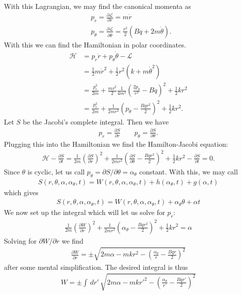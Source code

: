 \documentclass{article}
\theoremstyle{definition}
\newcommand{\p}{\partial}
\newcommand{\lag}{\mathcal{L}}
\newcommand{\ham}{\mathcal{H}}
\newcommand{\al}{\alpha}
\newcommand{\f}[2]{\frac{#1}{#2}}
\newcommand{\lp}{\left(}
\newcommand{\rp}{\right)}
\begin{document}
\begin{enumerate}[label=(\alph*)]
	With this Lagrangian, we may find the canonical momenta as 
	\begin{align*}
	&p_r = \f{\p \lag}{\p \dot r} =  m\dot r\\
	&p_\theta = \f{\p \lag}{\p \dot \theta}  = \f{r^2}{2} (Bq + 2m\dot\theta).
	\end{align*}
	With this we can find the Hamiltonian in polar coordinates. 
	\begin{align*}
	\ham  
	&= p_r \dot r + p_\theta \dot\theta - \lag \\
	&= \f{1}{2}m\dot r^2+ \f{1}{2}r^2(k+m\dot\theta^2) \\
	&= \f{p_r^2}{2m} + \f{mr^2}{2} \f{1}{4m^2}\lp \f{2p_\theta}{r^2} - Bq  \rp^2 + \f{1}{2}kr^2 \\
	&= \f{p_r^2}{2m} + \f{1}{2mr^2}\lp p_\theta - \f{Bqr^2}{2} \rp^2 + \f{1}{2}kr^2.
	\end{align*}
	Let $S$ be the Jacobi's complete integral. Then we have
	\begin{align*}
	p_r = \f{\p S}{\p r} \quad \quad p_\theta = \f{\p S}{\p \theta}.
	\end{align*}
	Plugging this into the Hamiltonian we find the Hamilton-Jacobi equation:
	\begin{align*}
	\ham  - \f{\p S}{\p t}  =
	\f{1}{2m}\lp \f{\p S}{\p r} \rp^2 + \f{1}{2mr^2}\lp \f{\p S}{\p \theta} - \f{Bqr^2}{2} \rp^2 + \f{1}{2}kr^2
	 - \f{\p S}{\p t} =0. 
	\end{align*}
	Since $\theta$ is cyclic, let us call $p_\theta = \p S/\p \theta  = \al_\theta$ constant. With this, we may call
	\begin{align*}
	S(r,\theta,\al,\al_\theta,t) = W(r,\theta,\al,\al_\theta,t) + h(\al_\theta,t) + g(\al,t)
	\end{align*}
	which gives
	\begin{align*}
	S(r,\theta,\al,\al_\theta,t) = W(r,\theta,\al,\al_\theta,t) + \al_\theta \theta + \al t
	\end{align*}
	We now set up the integral which will let us solve for $p_r$:
	\begin{align*}
	\f{1}{2m}\lp \f{\p W}{\p r} \rp^2 + \f{1}{2mr^2}\lp \al_\theta- \f{Bqr^2}{2} \rp^2 + \f{1}{2}kr^2 = \al
	\end{align*}
	Solving for $\p W/\p r$ we find 
	\begin{align*}
	{\f{\p W}{\p r} = \pm \sqrt{2m\al - mkr^2 -   \lp \f{\al_\theta}{r}- \f{Bqr}{2} \rp^2 }}
	\end{align*}
	after some mental simplification. The desired integral is thus
	\begin{align*}
	\boxed{W = \pm \int \,dr' \, \sqrt{2m\al - mkr'^2 -   \lp \f{\al_\theta}{r'}- \f{Bqr'}{2} \rp^2 } } 
	\end{align*}
	

\end{enumerate}
\end{document}

